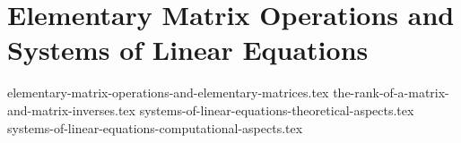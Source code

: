 \chapter{Elementary Matrix Operations and Systems of Linear Equations}
{elementary-matrix-operations-and-elementary-matrices.tex}
{the-rank-of-a-matrix-and-matrix-inverses.tex}
{systems-of-linear-equations-theoretical-aspects.tex}
{systems-of-linear-equations-computational-aspects.tex}
